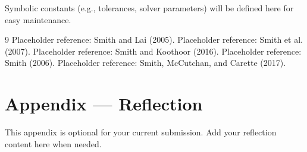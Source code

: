 \documentclass[12pt]{article}
\begin{document}
Symbolic constants (e.g., tolerances, solver parameters) will be defined here for easy maintenance.

\begin{thebibliography}{9}
 Placeholder reference: Smith and Lai (2005).
 Placeholder reference: Smith et al. (2007).
 Placeholder reference: Smith and Koothoor (2016).
 Placeholder reference: Smith (2006).
 Placeholder reference: Smith, McCutchan, and Carette (2017).
\end{thebibliography}

\newpage
\section*{Appendix --- Reflection}
This appendix is optional for your current submission. Add your reflection content here when needed.
\end{document}
